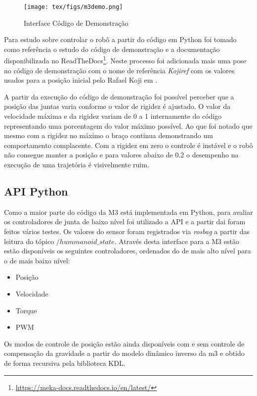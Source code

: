 \begin{figure}[H]
    \centering
    \texttt{[image: tex/figs/m3demo.png]}
    \caption{Interface Código de Demonstração}
    \label{fig:m3demo}
\end{figure}

Para estudo sobre controlar o robô a partir do código em Python foi tomado como referência o estudo do código de demonstração e a documentação disponibilizada no ReadTheDocs\footnote{\url{https://meka-docs.readthedocs.io/en/latest/}}. Neste processo foi adicionada mais uma pose no código de demonstração com o nome de referência \textit{Kojiref} com os valores usados para a posição inicial pelo Rafael Koji em \cite{nobody}.

A partir da execução do código de demonstração foi possível perceber que a posição das juntas varia conforme o valor de rigidez é ajustado. O valor da velocidade máxima e da rigidez variam de 0 a 1 internamente do código representando uma porcentagem do valor máximo possível. Ao que foi notado que mesmo com a rigidez no máximo o braço continua demonstrando um comportamento complacente. Com a rigidez em zero o controle é instável e o robô não consegue manter a posição e para valores abaixo de 0.2 o desempenho na execução de uma trajetória é visivelmente ruim.


\subsection{API Python}

Como a maior parte do código da M3 está implementada em Python, para avaliar os controladores de junta de baixo nível foi utilizado a API e a partir dai foram feitos vários testes. Os valores do sensor foram registrados via \textit{rosbag} a partir das leitura do tópico $/hummanoid\_state$. Através desta interface para a M3 estão estão disponíveis os seguintes controladores, ordenados do de mais alto nível para o de mais baixo nível:

\begin{itemize}
    \item Posição
    \item Velocidade
    \item Torque
    \item PWM
\end{itemize}

Os modos de controle de posição estão ainda disponíveis com e sem controle de compensação da gravidade a partir do modelo dinâmico inverso da m3 e obtido de forma recursiva pela biblioteca KDL\cite{nobody}.

